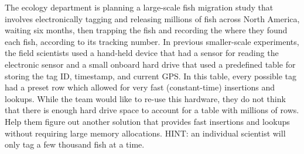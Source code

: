 \documentclass[12pt]{article}
\begin{document}
\renewcommand{\headrulewidth}{0.5pt}

\phantom{Test}

The ecology department is planning a large-scale fish migration study that
involves electronically tagging and releasing millions of fish across North
America, waiting six months, then trapping the fish and recording the where
they found each fish, according to its tracking number. In previous
smaller-scale experiments, the field scientists used a hand-held device that
had a sensor for reading the electronic sensor and a small onboard hard drive
that used a predefined table for storing the tag ID, timestamp, and current
GPS. In this table, every possible tag had a preset row which allowed for very
fast (constant-time) insertions and lookups. While the team would like to
re-use this hardware, they do not think that there is enough hard drive space
to account for a table with millions of rows. Help them figure out another
solution that provides fast insertions and lookups without requiring large
memory allocations. HINT: an individual scientist will only tag a few thousand
fish at a time.


\pagebreak
\end{document}
